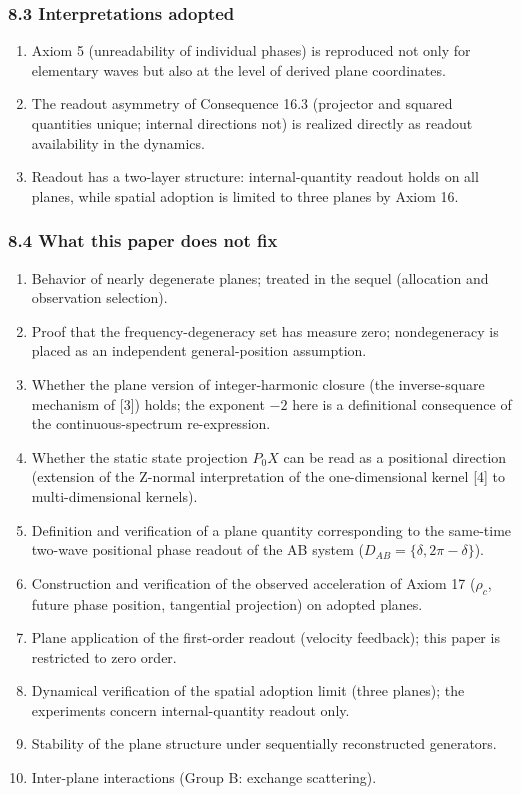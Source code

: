 \documentclass[
  a4paper,
]{article}
\providecommand{\tightlist}{%
  \setlength{\itemsep}{0pt}\setlength{\parskip}{0pt}}
\begin{document}
\subsubsection{8.3 Interpretations
adopted}\label{interpretations-adopted}

\begin{enumerate}
\def\labelenumi{\arabic{enumi}.}
\tightlist
\item
  Axiom 5 (unreadability of individual phases) is reproduced not only
  for elementary waves but also at the level of derived plane
  coordinates.
\item
  The readout asymmetry of Consequence 16.3 (projector and squared
  quantities unique; internal directions not) is realized directly as
  readout availability in the dynamics.
\item
  Readout has a two-layer structure: internal-quantity readout holds on
  all planes, while spatial adoption is limited to three planes by Axiom
  16.
\end{enumerate}

\subsubsection{8.4 What this paper does not
fix}\label{what-this-paper-does-not-fix}

\begin{enumerate}
\def\labelenumi{\arabic{enumi}.}
\tightlist
\item
  Behavior of nearly degenerate planes; treated in the sequel
  (allocation and observation selection).
\item
  Proof that the frequency-degeneracy set has measure zero;
  nondegeneracy is placed as an independent general-position assumption.
\item
  Whether the plane version of integer-harmonic closure (the
  inverse-square mechanism of {[}3{]}) holds; the exponent \(-2\) here
  is a definitional consequence of the continuous-spectrum
  re-expression.
\item
  Whether the static state projection \(P_0X\) can be read as a
  positional direction (extension of the Z-normal interpretation of the
  one-dimensional kernel {[}4{]} to multi-dimensional kernels).
\item
  Definition and verification of a plane quantity corresponding to the
  same-time two-wave positional phase readout of the AB system
  (\(D_{AB}=\{\delta,2\pi-\delta\}\)).
\item
  Construction and verification of the observed acceleration of Axiom 17
  (\(\rho_c\), future phase position, tangential projection) on adopted
  planes.
\item
  Plane application of the first-order readout (velocity feedback); this
  paper is restricted to zero order.
\item
  Dynamical verification of the spatial adoption limit (three planes);
  the experiments concern internal-quantity readout only.
\item
  Stability of the plane structure under sequentially reconstructed
  generators.
\item
  Inter-plane interactions (Group B: exchange scattering).
\end{enumerate}
\end{document}

